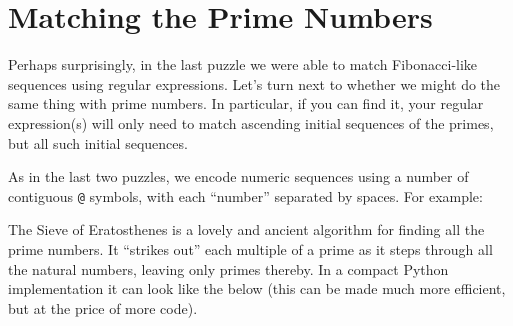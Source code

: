 \newpage

\hypertarget{matching-the-prime-numbers}{%
\section{Matching the Prime Numbers}\label{matching-the-prime-numbers}}

Perhaps surprisingly, in the last puzzle we were able to match
Fibonacci-like sequences using regular expressions. Let's turn next to
whether we might do the same thing with prime numbers. In particular, if
you can find it, your regular expression(s) will only need to match
ascending initial sequences of the primes, but all such initial
sequences.

As in the last two puzzles, we encode numeric sequences using a number
of contiguous \texttt{@} symbols, with each ``number'' separated by
spaces. For example:

\begin{Shaded}
\begin{Highlighting}[]
\OperatorTok{=} 
\OperatorTok{=} 
\OperatorTok{=} 
\OperatorTok{=} 
\end{Highlighting}
\end{Shaded}

The Sieve of Eratosthenes is a lovely and ancient algorithm for finding
all the prime numbers. It ``strikes out'' each multiple of a prime as it
steps through all the natural numbers, leaving only primes thereby. In a
compact Python implementation it can look like the below (this can be
made much more efficient, but at the price of more code).

\begin{Shaded}
\begin{Highlighting}[]
\OperatorTok{=} 
\OperatorTok{=}\NormalTok{ []}
     \NormalTok{:}
         \OperatorTok{\%}\OperatorTok{!=}  
\OperatorTok{+=} 
\end{Highlighting}
\end{Shaded}

